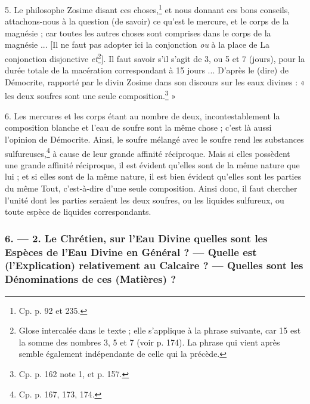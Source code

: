 \documentclass[a4paper, 11pt, oneside, polutonikogreek, french]{article}
\begin{document}
5. Le philosophe Zosime disant ces choses,\footnote{Cp. p. 92 et 235.} et nous donnant ces bons conseils, attachons-nous à la question (de savoir) ce qu'est le mercure, et le corps de la magnésie ; car toutes les autres choses sont comprises dans le corps de la magnésie ... [Il ne faut pas adopter ici la conjonction \emph{ou} à la place de La conjonction disjonctive \emph{et}\footnote{Glose intercalée dans le texte ; elle s'applique à la phrase suivante, car 15 est la somme des nombres 3, 5 et 7 (voir p. 174). La phrase qui vient après semble également indépendante de celle qui la précède.}]. Il faut savoir s'il s'agit de 3, ou 5 et 7 (jours), pour la durée totale de la macération correspondant à 15 jours ... D'après le (dire) de Démocrite, rapporté par le divin Zosime dans son discours sur les eaux divines : « les deux soufres sont une seule composition.\footnote{Cp. p. 162 note 1, et p. 157.} »

6. Les mercures et les corps étant au nombre de deux, incontestablement la composition blanche et l'eau de soufre sont la même chose ; c'est là aussi l'opinion de Démocrite. Ainsi, le soufre mélangé avec le soufre rend les substances sulfureuses,\footnote{Cp. p. 167, 173, 174.} à cause de leur grande affinité réciproque. Mais si elles possèdent une grande affinité réciproque, il est évident qu'elles sont de la même nature que lui ; et si elles sont de la même nature, il est bien évident qu'elles sont les parties du même Tout, c'est-à-dire d'une seule composition. Ainsi donc, il faut chercher l'unité dont les parties seraient les deux soufres, ou les liquides sulfureux, ou toute espèce de liquides correspondants.
\clearpage
\bigskip
\centerline{\EightStarTaper}
\centerline{\EightStarTaper\EightStarTaper}
\bigskip

\subsubsection{6. --- 2. Le Chrétien, sur l'Eau Divine quelles sont les Espèces de l'Eau Divine en Général ? --- Quelle est (l'Explication) relativement au Calcaire ? --- Quelles sont les Dénominations de ces (Matières) ?}
\end{document}

